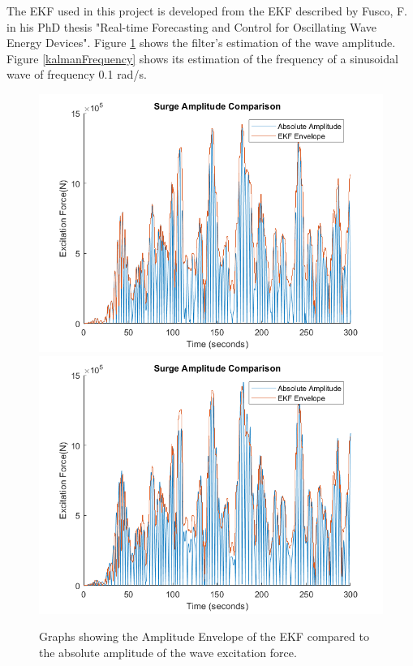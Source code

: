 \documentclass{report}
\begin{document}
The EKF used in this project is developed from the EKF described by Fusco, F. in his PhD thesis "Real-time Forecasting and Control for Oscillating Wave Energy Devices"\cite{EKF}. Figure \ref{kalmanAmplitudeEnvelope} shows the filter's estimation of the wave amplitude. Figure \ref{kalmanFrequency} shows its estimation of the frequency of a sinusoidal wave of frequency 0.1 rad/s.

\begin{figure}
\centering
\includegraphics[scale=0.5]{graphs/EKFSurgeEnvelope}
\includegraphics[scale=0.5]{graphs/EKFHeaveEnvelope}
\caption{Graphs showing the Amplitude Envelope of the EKF compared to the absolute amplitude of the wave excitation force.}
\label{kalmanAmplitudeEnvelope}
\end{figure} 
\end{document}
